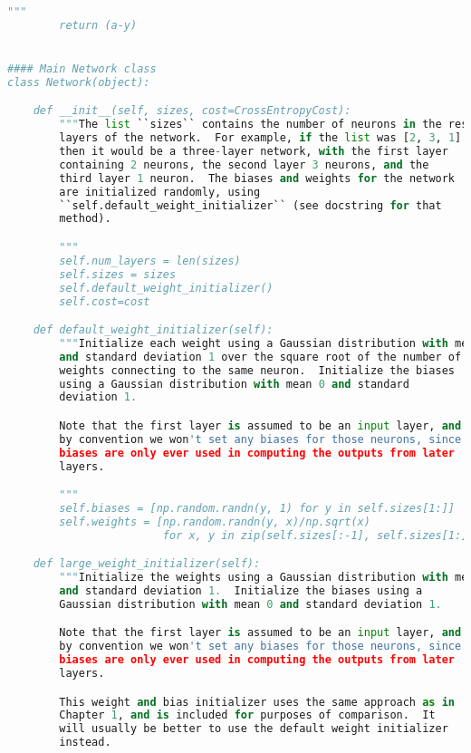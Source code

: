 \begin{lstlisting}[language=Python]
        """
        return (a-y)


#### Main Network class
class Network(object):

    def __init__(self, sizes, cost=CrossEntropyCost):
        """The list ``sizes`` contains the number of neurons in the respective
        layers of the network.  For example, if the list was [2, 3, 1]
        then it would be a three-layer network, with the first layer
        containing 2 neurons, the second layer 3 neurons, and the
        third layer 1 neuron.  The biases and weights for the network
        are initialized randomly, using
        ``self.default_weight_initializer`` (see docstring for that
        method).

        """
        self.num_layers = len(sizes)
        self.sizes = sizes
        self.default_weight_initializer()
        self.cost=cost

    def default_weight_initializer(self):
        """Initialize each weight using a Gaussian distribution with mean 0
        and standard deviation 1 over the square root of the number of
        weights connecting to the same neuron.  Initialize the biases
        using a Gaussian distribution with mean 0 and standard
        deviation 1.

        Note that the first layer is assumed to be an input layer, and
        by convention we won't set any biases for those neurons, since
        biases are only ever used in computing the outputs from later
        layers.

        """
        self.biases = [np.random.randn(y, 1) for y in self.sizes[1:]]
        self.weights = [np.random.randn(y, x)/np.sqrt(x)
                        for x, y in zip(self.sizes[:-1], self.sizes[1:])]

    def large_weight_initializer(self):
        """Initialize the weights using a Gaussian distribution with mean 0
        and standard deviation 1.  Initialize the biases using a
        Gaussian distribution with mean 0 and standard deviation 1.

        Note that the first layer is assumed to be an input layer, and
        by convention we won't set any biases for those neurons, since
        biases are only ever used in computing the outputs from later
        layers.

        This weight and bias initializer uses the same approach as in
        Chapter 1, and is included for purposes of comparison.  It
        will usually be better to use the default weight initializer
        instead.


\end{lstlisting}
